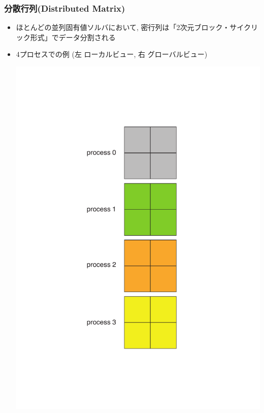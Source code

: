 \begin{frame}
  \frametitle{分散行列(Distributed Matrix)}
  \begin{itemize}
  \item ほとんどの並列固有値ソルバにおいて, 密行列は「2次元ブロック・サイクリック形式」でデータ分割される
  \item 4プロセスでの例 (左 ローカルビュー, 右 グローバルビュー)
  \begin{center}
    \includegraphics[height=0.45\textheight]{figure/local-view.pdf} \ \ \ \ \ \ \ \

\end{center}
\end{itemize}
\end{frame}
